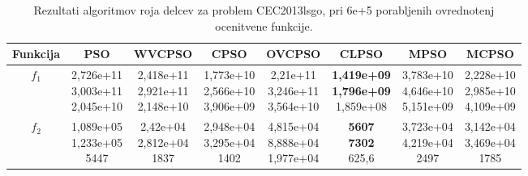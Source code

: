 \begin{table}[t]
\begin{small}
\begin{tabular}{|c|c|c|c|c|c|c|c|}
    \end{tabular}
\end{small}
\end{table}

\begin{table}[t]
    \renewcommand{\arraystretch}{1.1}
    \centering
    \caption{Rezultati algoritmov roja delcev za problem CEC2013lsgo, pri 6e+5 porabljenih ovrednotenj ocenitvene funkcije.} \label{tab:bech:opt_two_stats}
    \begin{small}
    \begin{tabular}{|c|c|c|c|c|c|c|c|}
        \hline
        Funkcija & PSO & WVCPSO & CPSO & OVCPSO & CLPSO & MPSO & MCPSO \\\hline
        $f_1$    & \makecell{2,726e+11 \\ 3,003e+11 \\ 2,045e+10} & \makecell{2,418e+11 \\ 2,921e+11 \\ 2,148e+10} & \makecell{1,773e+10 \\ 2,566e+10 \\ 3,906e+09} & \makecell{2,21e+11 \\ 3,246e+11 \\ 3,564e+10} & \makecell{\textbf{1,419e+09} \\ \textbf{1,796e+09} \\ 1,859e+08} & \makecell{3,783e+10 \\ 4,646e+10 \\ 5,151e+09} & \makecell{2,228e+10 \\ 2,985e+10 \\ 4,109e+09} \\\hline
        $f_2$    & \makecell{1,089e+05 \\ 1,233e+05 \\ 5447}      & \makecell{2,42e+04 \\ 2,812e+04 \\ 1837}       & \makecell{2,948e+04 \\ 3,295e+04 \\ 1402}      & \makecell{4,815e+04 \\ 8,888e+04 \\ 1,977e+04} & \makecell{\textbf{5607} \\ \textbf{7302} \\ 625,6}               & \makecell{3,723e+04 \\ 4,219e+04 \\ 2497}      & \makecell{3,142e+04 \\ 3,469e+04 \\ 1785}      \\\hline

\end{tabular}
\end{small}
\end{table}
